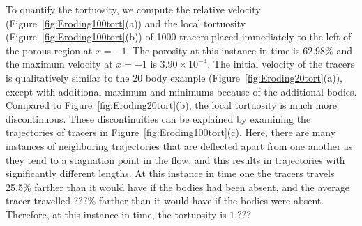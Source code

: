 \documentclass[preprint, 10pt]{elsarticle}
\begin{document}
To quantify the tortuosity, we compute the relative velocity
(Figure~\ref{fig:Eroding100tort}(a)) and the local tortuosity
(Figure~\ref{fig:Eroding100tort}(b)) of 1000 tracers placed immediately
to the left of the porous region at $x=-1$.  The porosity at this
instance in time is $62.98\%$ and the maximum velocity at $x=-1$ is
$3.90 \times 10^{-4}$. The initial velocity of the tracers is
qualitatively similar to the 20 body example
(Figure~\ref{fig:Eroding20tort}(a)), except with additional maximum and
minimums because of the additional bodies.  Compared to
Figure~\ref{fig:Eroding20tort}(b), the local tortuosity is much more
discontinuous.  These discontinuities can be explained by examining the
trajectories of tracers in Figure~\ref{fig:Eroding100tort}(c).  Here,
there are many instances of neighboring trajectories that are deflected
apart from one another as they tend to a stagnation point in the flow,
and this results in trajectories with significantly different lengths.
At this instance in time one the tracers travels 25.5\% farther than it
would have if the bodies had been absent, and the average tracer
travelled ???\% farther than it would have if the bodies were absent.
Therefore, at this instance in time, the tortuosity is $1.???$
\end{document}
